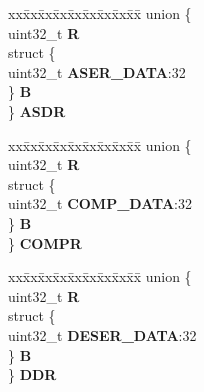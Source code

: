 \begin{DoxyCompactItemize}
\begin{tabbing}
\end{tabbing}\item 
\mbox{\label{structDSPI__tag_ad0fab82a3bc7ba679a4a028179ddc62a}} 
\begin{tabbing}
xx\=xx\=xx\=xx\=xx\=xx\=xx\=xx\=xx\=\kill
union \{\\
\>uint32\_t {\bfseries R}\\
\>struct \{\\
\>\>uint32\_t {\bfseries ASER\_DATA}:32\\
\>\} {\bfseries B}\\
\} {\bfseries ASDR}\\

\end{tabbing}\item 
\mbox{\label{structDSPI__tag_ac24dbe8b50086cdca661150c9aa6d67a}} 
\begin{tabbing}
xx\=xx\=xx\=xx\=xx\=xx\=xx\=xx\=xx\=\kill
union \{\\
\>uint32\_t {\bfseries R}\\
\>struct \{\\
\>\>uint32\_t {\bfseries COMP\_DATA}:32\\
\>\} {\bfseries B}\\
\} {\bfseries COMPR}\\

\end{tabbing}\item 
\mbox{\label{structDSPI__tag_ad783e458f18335fc007dca2376bc0680}} 
\begin{tabbing}
xx\=xx\=xx\=xx\=xx\=xx\=xx\=xx\=xx\=\kill
union \{\\
\>uint32\_t {\bfseries R}\\
\>struct \{\\
\>\>uint32\_t {\bfseries DESER\_DATA}:32\\
\>\} {\bfseries B}\\
\} {\bfseries DDR}\\


\end{tabbing}
\end{DoxyCompactItemize}
